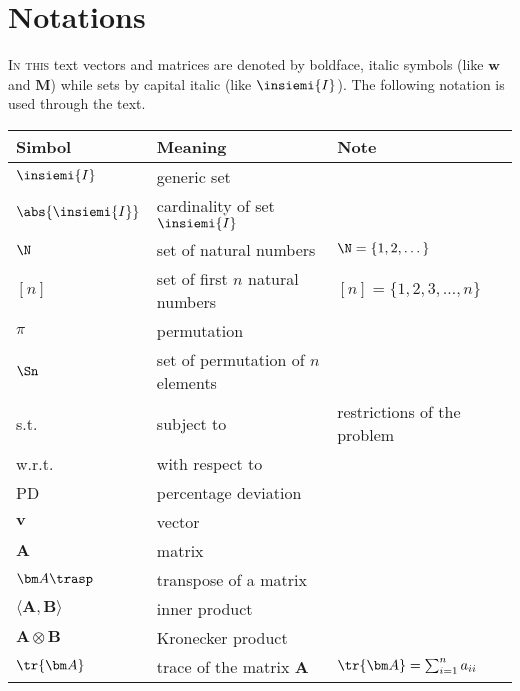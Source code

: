 \chapter{Notations}

\lettrine[lhang=1,lines=3]{\color{BrickRed}I}{n this } text vectors and matrices are denoted by boldface, italic symbols (like $\bm w$ and $\bm M$) while sets by capital italic (like $\insiemi{I}$). The following notation is used through the text.
\begin{table}[htp]
\centering
\begin{tabular}{lll}
	\toprule
	\textbf{Simbol} & \textbf{Meaning}  & \textbf{Note} \\
	\midrule
	$\insiemi{I}$& generic set & \\ 
	$\abs{\insiemi{I}}$   & cardinality of set $\insiemi{I}$ & \\
	$\N$  & set of natural numbers & $ \N= \{1,2,\dots\}$ \\
	$[n]$ & set of first $n$ natural numbers& $[n]=\{1,2,3,\dots,n\}$\\
	$\pi$ & permutation & \\
 	$\Sn$ & set of permutation of $n$ elements  &\\
	s.t.   & subject to &  restrictions of the problem \\
	w.r.t. & with respect to & \\
	PD & percentage deviation & \\
	$\bm v$ & vector &\\ 
	$\bm A$ & matrix &\\
	$\bm A\trasp$ & 	transpose of a matrix & \\
	$\langle \bm A,\bm B \rangle $ & inner product & \\
	$\bm A \otimes \bm B $ & Kronecker product  & \\
	$\tr{\bm A}$ & trace of the matrix $\bm A$ & $\tr{\bm A}=\sum_{i=1}^n a_{ii}$ \\ 
	\bottomrule
\end{tabular}
\end{table}

